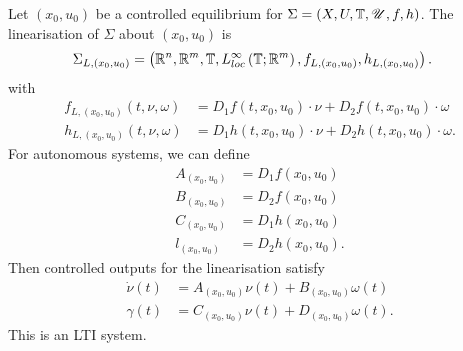 \begin{definition}
	Let $\left( x_0, u_0 \right) $ be a controlled equilibrium for $\Sigma = \left( X, U, \mathbb{T} , \mathscr{U}, f , h  \right) $. The linearisation of $\Sigma$ about $\left( x_0, u_0 \right) $ is 
	\begin{align*}
		\Sigma _{L, \left( x_0, u_0 \right) } &= \left( \mathbb{R}^{n}, \mathbb{R}^{m}, \mathbb{T} , L^{\infty}_{loc}\left( \mathbb{T} ; \mathbb{R}^{m} \right) , f_{L, \left( x_0, u_0 \right) }, h_{L, \left( x_0, u_0 \right) } \right)  
	.\end{align*}
	with
	\begin{align*}
		f_{L, \left( x_0, u_0 \right) }\left( t, \nu, \omega \right) &= D_1 f\left( t, x_0, u_0 \right) \cdot \nu + D_2 f\left( t, x_0, u_0 \right)  \cdot \omega \\
		h_{L, \left( x_0, u_0 \right) }\left( t, \nu, \omega \right) &= D_1 h\left( t, x_0, u_0 \right) \cdot \nu + D_2 h\left( t, x_0, u_0 \right)  \cdot \omega
	.\end{align*}
	For autonomous systems, we can define 
	\begin{align*}
		A_{\left( x_0, u_0 \right) } &= D_1 f\left( x_0, u_0 \right)  \\
		B_{\left( x_0, u_0 \right) } &= D_2 f\left( x_0, u_0 \right)  \\
		C_{\left( x_0, u_0 \right) } &= D_1 h\left( x_0, u_0 \right)  \\
		l_{\left( x_0, u_0 \right) } &= D_2 h\left( x_0, u_0 \right) 
	.\end{align*}
	Then controlled outputs for the linearisation satisfy
	\begin{align*}
		\dot{\nu} \left( t \right) &= A_{\left( x_0, u_0 \right) }\nu \left( t \right) + B_{\left( x_0, u_0 \right) }\omega \left( t \right) \\
		\gamma\left( t \right) &= C_{\left( x_0, u_0 \right) }\nu\left( t \right) + D_{\left( x_0, u_0 \right) }\omega\left( t \right) 
	.\end{align*}
	This is an LTI system.
	
\end{definition}
